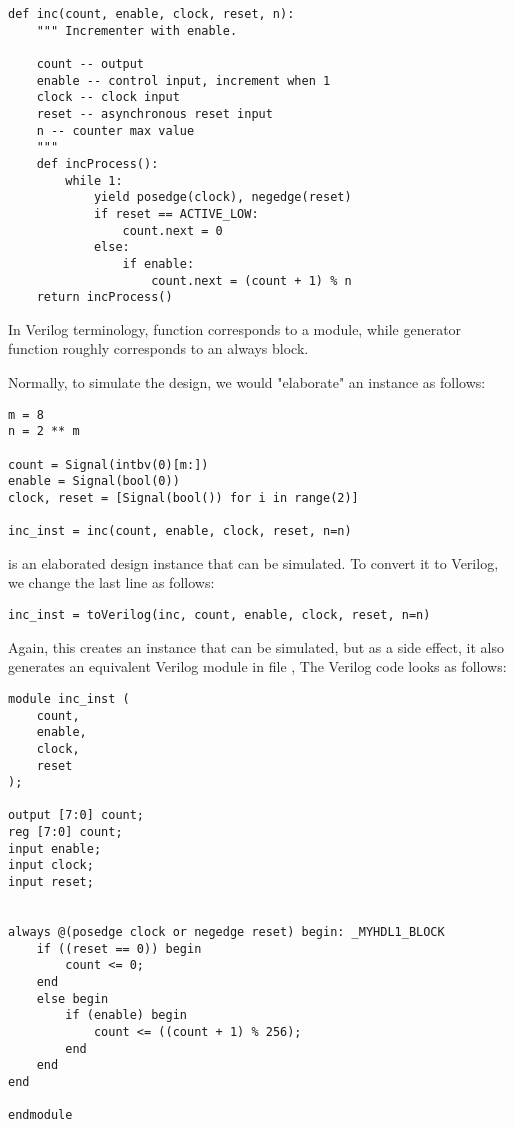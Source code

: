 \begin{verbatim}
def inc(count, enable, clock, reset, n):
    """ Incrementer with enable.
    
    count -- output
    enable -- control input, increment when 1
    clock -- clock input
    reset -- asynchronous reset input
    n -- counter max value
    """
    def incProcess():
        while 1:
            yield posedge(clock), negedge(reset)
            if reset == ACTIVE_LOW:
                count.next = 0
            else:
                if enable:
                    count.next = (count + 1) % n
    return incProcess()
\end{verbatim}

In Verilog terminology, function  corresponds to a
module, while generator function 
roughly corresponds to an always block.

Normally, to simulate the design, we would "elaborate" an instance
as follows:

\begin{verbatim}
m = 8
n = 2 ** m
 
count = Signal(intbv(0)[m:])
enable = Signal(bool(0))
clock, reset = [Signal(bool()) for i in range(2)]

inc_inst = inc(count, enable, clock, reset, n=n)
\end{verbatim}

 is an elaborated design instance that can be simulated. To
convert it to Verilog, we change the last line as follows:

\begin{verbatim}
inc_inst = toVerilog(inc, count, enable, clock, reset, n=n)
\end{verbatim}

Again, this creates an instance that can be simulated, but as a side
effect, it also generates an equivalent Verilog module in file ,
The Verilog code looks as follows:

\begin{verbatim}
module inc_inst (
    count,
    enable,
    clock,
    reset
);

output [7:0] count;
reg [7:0] count;
input enable;
input clock;
input reset;


always @(posedge clock or negedge reset) begin: _MYHDL1_BLOCK
    if ((reset == 0)) begin
        count <= 0;
    end
    else begin
        if (enable) begin
            count <= ((count + 1) % 256);
        end
    end
end

endmodule
\end{verbatim}

